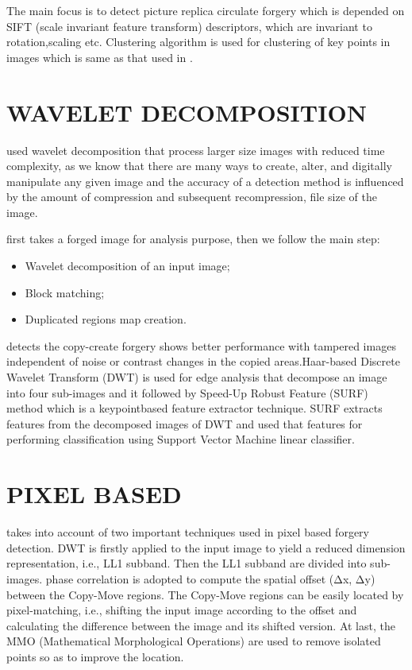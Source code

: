 \bigskip
The main focus is to detect picture replica circulate forgery which is depended on SIFT (scale invariant feature transform) descriptors, which are invariant to rotation,scaling etc. Clustering algorithm is used for clustering of key points in images which is same as that used in \cite{suman}.
\section{WAVELET DECOMPOSITION}
 \cite{kashyap} used wavelet decomposition that process larger size images with reduced time complexity, as we know that there are many ways to create, alter, and digitally manipulate any given image and the accuracy of a detection method is influenced by the amount of compression and subsequent recompression, file size of the image.

\bigskip
\cite{kashyap} first takes a forged image for analysis purpose, then we follow the main step:
\begin{itemize}
  \item Wavelet decomposition of an input image;
  \item Block matching;
  \item Duplicated regions map creation. 
\end{itemize}  

\bigskip
\cite{tulsi} detects the copy-create forgery shows better performance with tampered images independent of noise or contrast changes in the copied areas.Haar-based Discrete Wavelet Transform (DWT) is used for edge analysis that decompose an image into four sub-images and it followed by Speed-Up Robust Feature (SURF) method which is a keypointbased feature extractor technique. SURF extracts features from the decomposed images of DWT and used that features for performing classification using Support Vector Machine linear classifier.
\section{PIXEL BASED }
\cite{kanikar} takes into account of two important techniques used in pixel based forgery detection. DWT is firstly applied to the input image  to yield  a  reduced dimension  representation, i.e., LL1 subband. Then the LL1 subband are divided into  sub-images.  phase  correlation  is  adopted  to compute  the  spatial  offset  (Δx,  Δy)  between  the Copy-Move regions. The Copy-Move regions can be easily  located  by  pixel-matching,  i.e.,  shifting  the input  image according  to the  offset and  calculating the  difference  between  the  image  and  its  shifted version.  At  last,  the  MMO  (Mathematical Morphological  Operations)  are  used  to  remove isolated points so as to improve the location.


